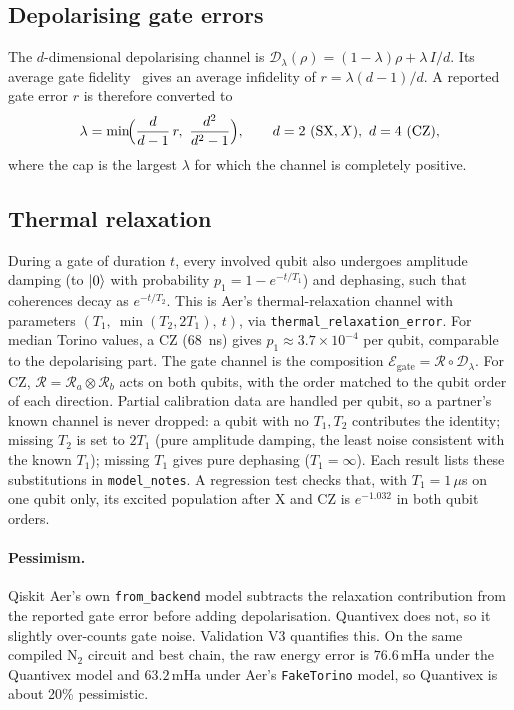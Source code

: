 \documentclass[10pt,a4paper]{article}
\newcommand{\mHa}{\,\mathrm{mHa}}
\newcommand{\code}[1]{\texttt{\small #1}}
\begin{document}
\subsection{Depolarising gate errors}
The $d$-dimensional depolarising channel is $\mathcal D_\lambda(\rho)=(1-\lambda)\rho+\lambda\,I/d$. Its average gate fidelity~\cite{Nielsen2002} gives an average infidelity of $r=\lambda(d-1)/d$. A reported gate error $r$ is therefore converted to
\begin{equation}
\lambda = \min\!\Bigl(\frac{d}{d-1}\,r,\ \frac{d^2}{d^2-1}\Bigr),\qquad d=2\ (\mathrm{SX},X),\ d=4\ (\mathrm{CZ}),
\end{equation}
where the cap is the largest $\lambda$ for which the channel is completely positive.

\subsection{Thermal relaxation}
During a gate of duration $t$, every involved qubit also undergoes amplitude damping (to $\ket0$ with probability $p_1=1-e^{-t/T_1}$) and dephasing, such that coherences decay as $e^{-t/T_2}$. This is Aer's thermal-relaxation channel with parameters $(T_1,\ \min(T_2,2T_1),\ t)$, via \code{thermal\_relaxation\_error}. For median Torino values, a CZ ($68$~ns) gives $p_1\approx3.7\times10^{-4}$ per qubit, comparable to the depolarising part. The gate channel is the composition $\mathcal E_{\mathrm{gate}}=\mathcal R\circ\mathcal D_\lambda$. For CZ, $\mathcal R=\mathcal R_a\otimes\mathcal R_b$ acts on both qubits, with the order matched to the qubit order of each direction. Partial calibration data are handled per qubit, so a partner's known channel is never dropped: a qubit with no $T_1,T_2$ contributes the identity; missing $T_2$ is set to $2T_1$ (pure amplitude damping, the least noise consistent with the known $T_1$); missing $T_1$ gives pure dephasing ($T_1=\infty$). Each result lists these substitutions in \code{model\_notes}. A regression test checks that, with $T_1=1\,\mu$s on one qubit only, its excited population after X and CZ is $e^{-1.032}$ in both qubit orders.

\paragraph{Pessimism.} Qiskit Aer's own \code{from\_backend} model subtracts the relaxation contribution from the reported gate error before adding depolarisation. Quantivex does not, so it slightly over-counts gate noise. Validation V3 quantifies this. On the same compiled N$_2$ circuit and best chain, the raw energy error is $76.6\mHa$ under the Quantivex model and $63.2\mHa$ under Aer's \texttt{FakeTorino} model, so Quantivex is about 20\% pessimistic.
\end{document}
